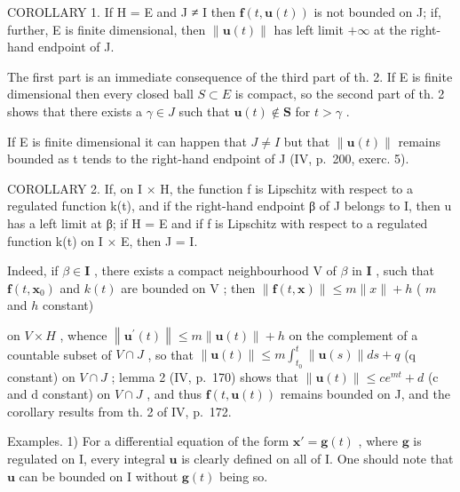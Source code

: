 COROLLARY 1. If H = E and J ≠ I then \(\mathbf{f}(t, \mathbf{u}(t))\) is not bounded on J; if, further, E is finite dimensional, then \(\| \mathbf{u}(t) \|\) has left limit \(+\infty\) at the right-hand endpoint of J.

The first part is an immediate consequence of the third part of th. 2. If E is finite dimensional then every closed ball \(S \subset E\) is compact, so the second part of th. 2 shows that there exists a \(\gamma \in J\) such that \(\mathbf{u}(t) \notin \mathbf{S}\) for \(t > \gamma\) .

If E is finite dimensional it can happen that \(J \neq I\) but that \(\|\mathbf{u}(t)\|\) remains bounded as t tends to the right-hand endpoint of J (IV, p.~200, exerc. 5).

COROLLARY 2. If, on I × H, the function f is Lipschitz with respect to a regulated function k(t), and if the right-hand endpoint β of J belongs to I, then u has a left limit at β; if H = E and if f is Lipschitz with respect to a regulated function k(t) on I × E, then J = I.

Indeed, if \(\beta \in \mathbf{I}\) , there exists a compact neighbourhood \(\mathrm{V}\) of \(\beta\) in \(\mathbf{I}\) , such that \(\mathbf{f}(t, \mathbf{x}_0)\) and \(k(t)\) are bounded on \(\mathrm{V}\) ; then \(\| \mathbf{f}(t, \mathbf{x}) \| \leqslant m \| x \| + h\) ( \(m\) and \(h\) constant)

on \(V \times H\) , whence \(\left\|\mathbf{u}^{\prime}(t)\right\| \leqslant m \left\|\mathbf{u}(t)\right\| + h\) on the complement of a countable subset of \(V \cap J\) , so that \(\left\|\mathbf{u}(t)\right\| \leqslant m \int_{t_{0}}^{t} \left\|\mathbf{u}(s)\right\| ds + q\) (q constant) on \(V \cap J\) ; lemma 2 (IV, p.~170) shows that \(\left\|\mathbf{u}(t)\right\| \leqslant c e^{mt} + d\) (c and d constant) on \(V \cap J\) , and thus \(\mathbf{f}(t, \mathbf{u}(t))\) remains bounded on J, and the corollary results from th. 2 of IV, p.~172.

Examples. 1) For a differential equation of the form \(\mathbf{x}' = \mathbf{g}(t)\) , where \(\mathbf{g}\) is regulated on I, every integral \(\mathbf{u}\) is clearly defined on all of I. One should note that \(\mathbf{u}\) can be bounded on I without \(\mathbf{g}(t)\) being so.

